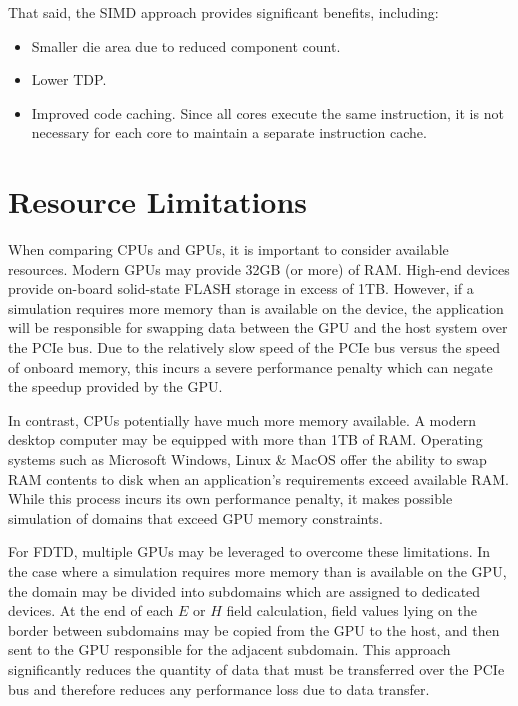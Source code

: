 That said, the SIMD approach provides significant benefits, including:

\begin{itemize}
	\item Smaller die area due to reduced component count.
	\item Lower TDP.
	\item Improved code caching. Since all cores execute the same instruction, it is not necessary for each core to maintain a separate instruction cache. 
\end{itemize}

\section{Resource Limitations}

When comparing CPUs and GPUs, it is important to consider available resources. Modern GPUs may provide 32GB (or more) of RAM.  High-end devices provide on-board solid-state FLASH storage in excess of 1TB. However, if a simulation requires more memory than is available on the device, the application will be responsible for swapping data between the GPU and the host system over the PCIe bus. Due to the relatively slow speed of the PCIe bus versus the speed of onboard memory, this incurs a severe performance penalty which can negate the speedup provided by the GPU. 

In contrast, CPUs potentially have much more memory available. A modern desktop computer may be equipped with more than 1TB of RAM. Operating systems such as Microsoft Windows, Linux \& MacOS offer the ability to swap RAM contents to disk when an application's requirements exceed available RAM. While this process incurs its own performance penalty, it makes possible simulation of domains that exceed GPU memory constraints.

\iffalse
I'd like a wrapping up paragraph here to say that for the problem you are looking at GPU's make sense as a choice and why (likely get enough of them that cache memory isn't swapped often...) or some other tie back to the work.
\fi

For FDTD, multiple GPUs may be leveraged to overcome these limitations. In the case where a simulation requires more memory than is available on the GPU, the domain may be divided into subdomains which are assigned to dedicated devices. At the end of each $E$ or $H$ field calculation, field values lying on the border between subdomains may be copied from the GPU to the host, and then sent to the GPU responsible for the adjacent subdomain. This approach significantly reduces the quantity of data that must be transferred over the PCIe bus and therefore reduces any performance loss due to data transfer. 






